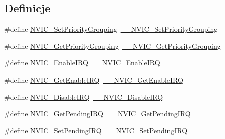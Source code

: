 \subsection*{Definicje}
\begin{DoxyCompactItemize}
\item 
\#define \hyperlink{group___c_m_s_i_s___core___n_v_i_c_functions_ga0e798d5aec68cdd8263db86a76df788f}{N\+V\+I\+C\+\_\+\+Set\+Priority\+Grouping}~\hyperlink{group___c_m_s_i_s___core___n_v_i_c_functions_gafc94dcbaee03e4746ade1f5bb9aaa56d}{\+\_\+\+\_\+\+N\+V\+I\+C\+\_\+\+Set\+Priority\+Grouping}
\item 
\#define \hyperlink{group___c_m_s_i_s___core___n_v_i_c_functions_ga4eeb9214f2264fc23c34ad5de2d3fa11}{N\+V\+I\+C\+\_\+\+Get\+Priority\+Grouping}~\hyperlink{group___c_m_s_i_s___core___n_v_i_c_functions_ga9b894af672df4373eb637f8288845c05}{\+\_\+\+\_\+\+N\+V\+I\+C\+\_\+\+Get\+Priority\+Grouping}
\item 
\#define \hyperlink{group___c_m_s_i_s___core___n_v_i_c_functions_ga57b3064413dbc7459d9646020fdd8bef}{N\+V\+I\+C\+\_\+\+Enable\+I\+RQ}~\hyperlink{group___c_m_s_i_s___core___n_v_i_c_functions_ga71227e1376cde11eda03fcb62f1b33ea}{\+\_\+\+\_\+\+N\+V\+I\+C\+\_\+\+Enable\+I\+RQ}
\item 
\#define \hyperlink{group___c_m_s_i_s___core___n_v_i_c_functions_ga857de13232ec65dd15087eaa15bc4a69}{N\+V\+I\+C\+\_\+\+Get\+Enable\+I\+RQ}~\hyperlink{group___c_m_s_i_s___core___n_v_i_c_functions_gaaeb5e7cc0eaad4e2817272e7bf742083}{\+\_\+\+\_\+\+N\+V\+I\+C\+\_\+\+Get\+Enable\+I\+RQ}
\item 
\#define \hyperlink{group___c_m_s_i_s___core___n_v_i_c_functions_ga73b4e251f59cab4e9a5e234aac02ae57}{N\+V\+I\+C\+\_\+\+Disable\+I\+RQ}~\hyperlink{group___c_m_s_i_s___core___n_v_i_c_functions_gae016e4c1986312044ee768806537d52f}{\+\_\+\+\_\+\+N\+V\+I\+C\+\_\+\+Disable\+I\+RQ}
\item 
\#define \hyperlink{group___c_m_s_i_s___core___n_v_i_c_functions_gac608957a239466e9e0cbc30aa64feb3b}{N\+V\+I\+C\+\_\+\+Get\+Pending\+I\+RQ}~\hyperlink{group___c_m_s_i_s___core___n_v_i_c_functions_ga5a92ca5fa801ad7adb92be7257ab9694}{\+\_\+\+\_\+\+N\+V\+I\+C\+\_\+\+Get\+Pending\+I\+RQ}
\item 
\#define \hyperlink{group___c_m_s_i_s___core___n_v_i_c_functions_ga2b47e2e52cf5c48a5c3348636434b3ac}{N\+V\+I\+C\+\_\+\+Set\+Pending\+I\+RQ}~\hyperlink{group___c_m_s_i_s___core___n_v_i_c_functions_gaabefdd4b790b9a7308929938c0c1e1ad}{\+\_\+\+\_\+\+N\+V\+I\+C\+\_\+\+Set\+Pending\+I\+RQ}
\item 

\end{DoxyCompactItemize}
